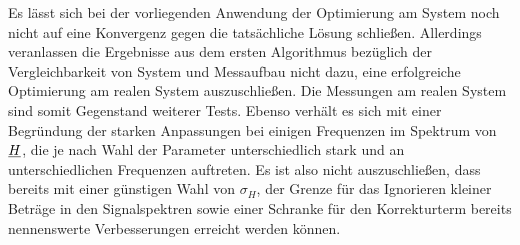 \documentclass[../Report.tex]{subfiles}
\begin{document}
\noindent
Es lässt sich bei der vorliegenden Anwendung der Optimierung am \mock System noch nicht auf eine Konvergenz gegen die tatsächliche Lösung schließen. Allerdings veranlassen die Ergebnisse aus dem ersten Algorithmus bezüglich der Vergleichbarkeit von \mock System und Messaufbau nicht dazu, eine erfolgreiche Optimierung am realen System auszuschließen.
Die Messungen am realen System sind somit Gegenstand weiterer Tests. Ebenso verhält es sich mit einer Begründung der starken Anpassungen bei einigen Frequenzen im Spektrum von $\underline{H}$, die je nach Wahl der Parameter unterschiedlich stark und an unterschiedlichen Frequenzen auftreten. Es ist also nicht auszuschließen, dass bereits mit einer günstigen Wahl von $\sigma_H$, der Grenze für das Ignorieren kleiner Beträge in den Signalspektren sowie einer Schranke für den Korrekturterm bereits nennenswerte Verbesserungen erreicht werden können.
\end{document}

